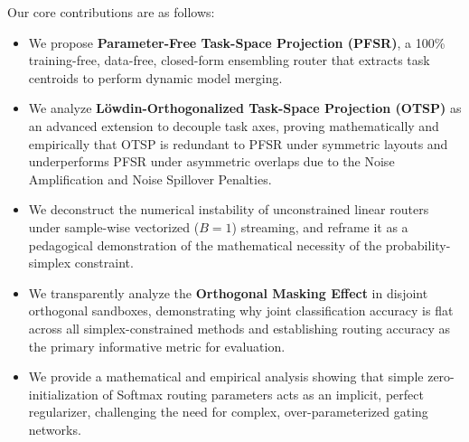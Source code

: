 Our core contributions are as follows:
\begin{itemize}
    \item We propose \textbf{Parameter-Free Task-Space Projection (PFSR)}, a 100\% training-free, data-free, closed-form ensembling router that extracts task centroids to perform dynamic model merging.
    \item We analyze \textbf{L{\"o}wdin-Orthogonalized Task-Space Projection (OTSP)} as an advanced extension to decouple task axes, proving mathematically and empirically that OTSP is redundant to PFSR under symmetric layouts and underperforms PFSR under asymmetric overlaps due to the Noise Amplification and Noise Spillover Penalties.
    \item We deconstruct the numerical instability of unconstrained linear routers under sample-wise vectorized ($B=1$) streaming, and reframe it as a pedagogical demonstration of the mathematical necessity of the probability-simplex constraint.
    \item We transparently analyze the \textbf{Orthogonal Masking Effect} in disjoint orthogonal sandboxes, demonstrating why joint classification accuracy is flat across all simplex-constrained methods and establishing routing accuracy as the primary informative metric for evaluation.
    \item We provide a mathematical and empirical analysis showing that simple zero-initialization of Softmax routing parameters acts as an implicit, perfect regularizer, challenging the need for complex, over-parameterized gating networks.
\end{itemize}
